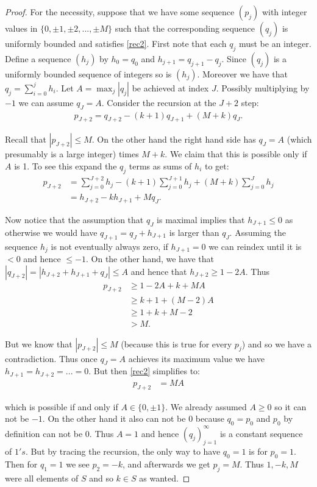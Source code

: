 \documentclass[11pt]{amsart}
\numberwithin{theorem}{section} %
\numberwithin{corollary}{section}
\numberwithin{lemma}{section}
\numberwithin{proposition}{section}
\numberwithin{definition}{section}
\begin{document}
\begin{proof}
For the necessity, suppose that we have some sequence $(p_j)$ with integer values in $\{ 0, \pm 1, \pm 2, ..., \pm M \}$ such that the corresponding sequence $(q_j)$ is uniformly bounded and satisfies \eqref{rec2}. First note that each $q_j$ must be an integer. Define a sequence $(h_j)$ by $h_0 = q_0$ and $h_{j+1} = q_{j+1} - q_j$. Since $(q_j)$ is a uniformly bounded sequence of integers so is $(h_j)$. Moreover we have that $q_j = \sum_{i=0}^j h_i$. Let $A = \max_{j} |q_j|$ be achieved at index $J$. Possibly multiplying by $-1$ we can assume $q_J = A$. Consider the recursion at the $J+2$ step:
\begin{align*}
p_{J+2} = q_{J+2} - (k+1)q_{J+1} + (M+k)q_J.
\end{align*}

Recall that $|p_{J+2}| \leq M$. On the other hand the right hand side has $q_J = A$ (which presumably is a large integer) times $M+k$. We claim that this is possible only if $A$ is 1. To see this expand the $q_j$ terms as sums of $h_i$ to get:
\begin{align*}
p_{J+2} &= \sum_{j=0}^{J+2} h_j - (k+1) \sum_{j=0}^{J+1} h_j + (M+k) \sum_{j=0}^J h_j \\
&= h_{J+2} - kh_{J+1} + Mq_J.
\end{align*}

Now notice that the assumption that $q_J$ is maximal implies that $h_{J+1} \leqslant 0$ as otherwise we would have $q_{J+1} = q_J + h_{J+1}$ is larger than $q_J$. Assuming the sequence $h_j$ is not eventually always zero, if $h_{J+1} = 0$ we can reindex until it is $< 0$ and hence $\leqslant -1$. On the other hand, we have that $|q_{J+2}| = |h_{J+2} + h_{J+1} + q_J| \leqslant A$ and hence that $h_{J+2} \geqslant 1-2A$. Thus
\begin{align*}
p_{J+2} & \geqslant 1-2A + k + MA\\
&\geqslant k + 1 + (M-2)A\\
&\geqslant 1 + k + M - 2 \\
& > M.
\end{align*}

But we know that $|p_{J+2}| \leq M$ (because this is true for every $p_j$) and so we have a contradiction. Thus once $q_J = A$ achieves its maximum value we have $h_{J+1} = h_{J+2} = ... = 0$. But then \eqref{rec2} simplifies to:
\begin{align*}
p_{J+2} &= MA
\end{align*}

which is possible if and only if $A \in \{0, \pm 1 \}$. We already assumed $A \geqslant 0$ so it can not be $-1$. On the other hand it also can not be $0$ because $q_0 = p_0$ and $p_0$ by definition can not be $0$. Thus $A = 1$ and hence $(q_j)_{j=1}^\infty$ is a constant sequence of $1's$. But by tracing the recursion, the only way to have $q_0 = 1$ is for $p_0 = 1$. Then for $q_1 = 1$ we see $p_2 = -k$, and afterwards we get $p_j = M$. Thus $1, -k, M$ were all elements of $S$ and so $k \in S$ as wanted.

\end{proof}
\end{document}
